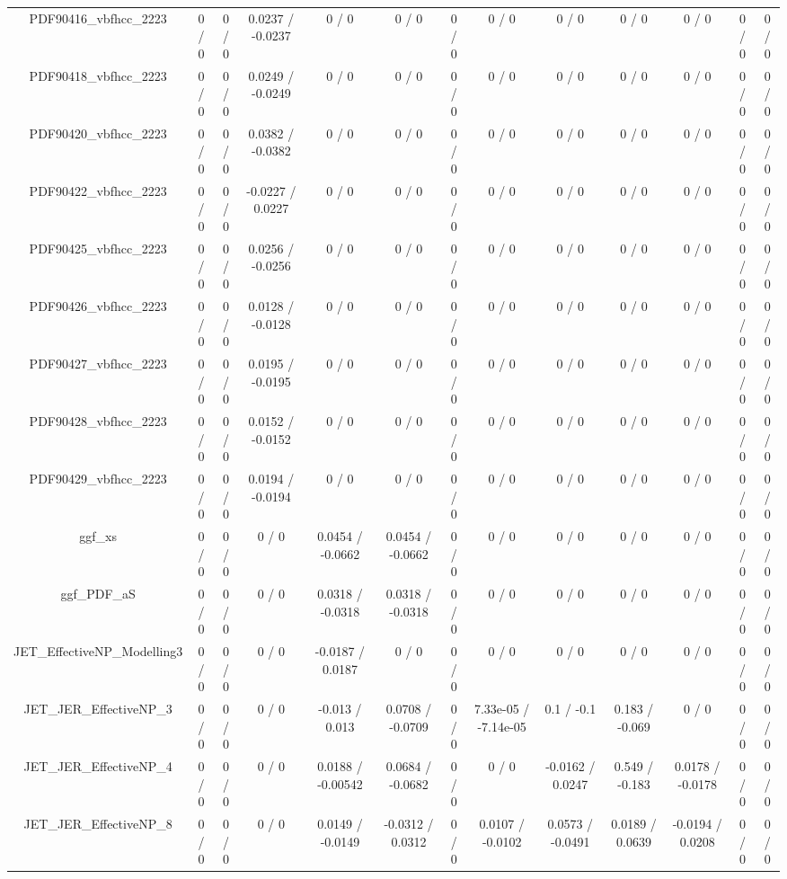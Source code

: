 \documentclass[10pt]{article}
\begin{document}
\begin{table}[htbp]
\begin{center}
\begin{tabular}{|c|c|c|c|c|c|c|c|c|c|c|c|c|}
  PDF90416_vbfhcc_2223 & 0 / 0 & 0 / 0 & 0.0237 / -0.0237 & 0 / 0 & 0 / 0 & 0 / 0 & 0 / 0 & 0 / 0 & 0 / 0 & 0 / 0 & 0 / 0 & 0 / 0 \\ 
  PDF90418_vbfhcc_2223 & 0 / 0 & 0 / 0 & 0.0249 / -0.0249 & 0 / 0 & 0 / 0 & 0 / 0 & 0 / 0 & 0 / 0 & 0 / 0 & 0 / 0 & 0 / 0 & 0 / 0 \\ 
  PDF90420_vbfhcc_2223 & 0 / 0 & 0 / 0 & 0.0382 / -0.0382 & 0 / 0 & 0 / 0 & 0 / 0 & 0 / 0 & 0 / 0 & 0 / 0 & 0 / 0 & 0 / 0 & 0 / 0 \\ 
  PDF90422_vbfhcc_2223 & 0 / 0 & 0 / 0 & -0.0227 / 0.0227 & 0 / 0 & 0 / 0 & 0 / 0 & 0 / 0 & 0 / 0 & 0 / 0 & 0 / 0 & 0 / 0 & 0 / 0 \\ 
  PDF90425_vbfhcc_2223 & 0 / 0 & 0 / 0 & 0.0256 / -0.0256 & 0 / 0 & 0 / 0 & 0 / 0 & 0 / 0 & 0 / 0 & 0 / 0 & 0 / 0 & 0 / 0 & 0 / 0 \\ 
  PDF90426_vbfhcc_2223 & 0 / 0 & 0 / 0 & 0.0128 / -0.0128 & 0 / 0 & 0 / 0 & 0 / 0 & 0 / 0 & 0 / 0 & 0 / 0 & 0 / 0 & 0 / 0 & 0 / 0 \\ 
  PDF90427_vbfhcc_2223 & 0 / 0 & 0 / 0 & 0.0195 / -0.0195 & 0 / 0 & 0 / 0 & 0 / 0 & 0 / 0 & 0 / 0 & 0 / 0 & 0 / 0 & 0 / 0 & 0 / 0 \\ 
  PDF90428_vbfhcc_2223 & 0 / 0 & 0 / 0 & 0.0152 / -0.0152 & 0 / 0 & 0 / 0 & 0 / 0 & 0 / 0 & 0 / 0 & 0 / 0 & 0 / 0 & 0 / 0 & 0 / 0 \\ 
  PDF90429_vbfhcc_2223 & 0 / 0 & 0 / 0 & 0.0194 / -0.0194 & 0 / 0 & 0 / 0 & 0 / 0 & 0 / 0 & 0 / 0 & 0 / 0 & 0 / 0 & 0 / 0 & 0 / 0 \\ 
  ggf_xs & 0 / 0 & 0 / 0 & 0 / 0 & 0.0454 / -0.0662 & 0.0454 / -0.0662 & 0 / 0 & 0 / 0 & 0 / 0 & 0 / 0 & 0 / 0 & 0 / 0 & 0 / 0 \\ 
  ggf_PDF_aS & 0 / 0 & 0 / 0 & 0 / 0 & 0.0318 / -0.0318 & 0.0318 / -0.0318 & 0 / 0 & 0 / 0 & 0 / 0 & 0 / 0 & 0 / 0 & 0 / 0 & 0 / 0 \\ 
  JET_EffectiveNP_Modelling3 & 0 / 0 & 0 / 0 & 0 / 0 & -0.0187 / 0.0187 & 0 / 0 & 0 / 0 & 0 / 0 & 0 / 0 & 0 / 0 & 0 / 0 & 0 / 0 & 0 / 0 \\ 
  JET_JER_EffectiveNP_3 & 0 / 0 & 0 / 0 & 0 / 0 & -0.013 / 0.013 & 0.0708 / -0.0709 & 0 / 0 & 7.33e-05 / -7.14e-05 & 0.1 / -0.1 & 0.183 / -0.069 & 0 / 0 & 0 / 0 & 0 / 0 \\ 
  JET_JER_EffectiveNP_4 & 0 / 0 & 0 / 0 & 0 / 0 & 0.0188 / -0.00542 & 0.0684 / -0.0682 & 0 / 0 & 0 / 0 & -0.0162 / 0.0247 & 0.549 / -0.183 & 0.0178 / -0.0178 & 0 / 0 & 0 / 0 \\ 
  JET_JER_EffectiveNP_8 & 0 / 0 & 0 / 0 & 0 / 0 & 0.0149 / -0.0149 & -0.0312 / 0.0312 & 0 / 0 & 0.0107 / -0.0102 & 0.0573 / -0.0491 & 0.0189 / 0.0639 & -0.0194 / 0.0208 & 0 / 0 & 0 / 0 \\ 

\end{tabular}
\end{center}
\end{table}
\end{document}
